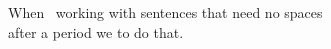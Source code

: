 \documentclass{article}
\begin{document}
When ~working with sentences that need no spaces\\
after a period we  \textbackslash@ to do that\@.
\end{document}
